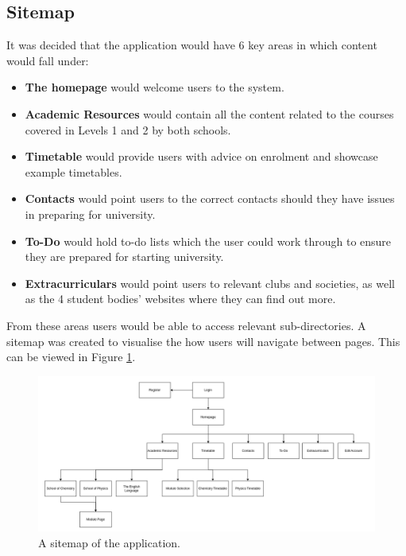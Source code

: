 \documentclass{l4proj}
\begin{document}
\subsection{Sitemap}
It was decided that the application would have 6 key areas in which content would fall under:
\begin{itemize}
    \item \textbf{The homepage} would welcome users to the system. 
    \item \textbf{Academic Resources} would contain all the content related to the courses covered in Levels 1 and 2 by both schools. 
    \item \textbf{Timetable} would provide users with advice on enrolment and showcase example timetables. 
    \item \textbf{Contacts} would point users to the correct contacts should they have issues in preparing for university. 
    \item \textbf{To-Do} would hold to-do lists which the user could work through to ensure they are prepared for starting university.
    \item \textbf{Extracurriculars} would point users to relevant clubs and societies,  as well as the 4 student bodies' websites where they can find out more.
\end{itemize}
From these areas users would be able to access relevant sub-directories. A sitemap was created to visualise the how users will navigate between pages. This can be viewed in Figure \ref{fig:sitemap}. 

\begin{figure}[ht]
    \centering
    \includegraphics[width=\linewidth]{images/sitemap.pdf}    

    \caption{A sitemap of the application.}

    \label{fig:sitemap} 
\end{figure}
\end{document}
